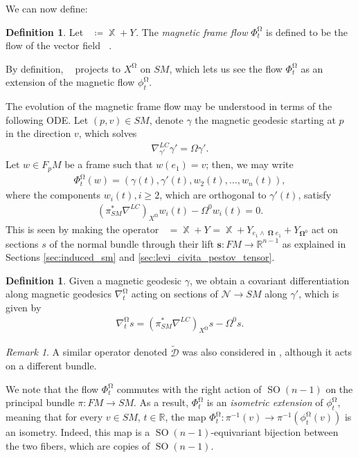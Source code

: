\documentclass[12pt]{amsart}
\numberwithin{numbering}{section}
\theoremstyle{plain}
\theoremstyle{definition}
\newtheorem{df}[numbering]{Definition}
\theoremstyle{remark}
\newtheorem{rmq}[numbering]{Remark}
\numberwithin{equation}{section}
\DeclareMathOperator{\SO}{SO}
\DeclareMathOperator{\xx}{\mathbb{X}}
\DeclareMathOperator{\xs}{\mathbb{X}^{\mg}}
\DeclareMathOperator{\oo}{\mathbf{\Omega}}
\DeclareMathOperator{\ot}{\widetilde{\mathbf{\Omega}}}
\DeclareMathOperator{\mg}{\Omega}
\newcommand{\psm}{\pi_{SM}}
\newcommand{\R}{\mathbb{R}}
\begin{document}
\medskip 

We can now define:
\begin{df}
Let $\xs \coloneq \xx + Y_{\ot}$. The \emph{magnetic frame flow} $\Phi_t^{\mg}$ is defined to be the flow of the vector field $\xs$.
\end{df}
By definition, $\xs$ projects to $X^{\mg}$ on $SM$, which lets us see the flow $\Phi_t^{\mg}$ as an extension of the magnetic flow $\phi_t^{\mg}$.

\medskip

The evolution of the magnetic frame flow may be understood in terms of the following ODE. Let $(p, v) \in SM$, denote $\gamma$ the magnetic geodesic starting at $p$ in the direction $v$, which solves 
\begin{align*}
\nabla^{LC}_{\gamma'} \gamma' = \Omega \gamma'.
\end{align*}
Let $w \in F_pM$ be a frame such that $w(e_1) = v$; then, we may write 
\begin{align*}
\Phi_t^{\mg}(w) = (\gamma(t), \gamma'(t), w_2(t), \ldots, w_n(t)),
\end{align*}
where the components $w_i(t), i \geq 2$, which are orthogonal to $\gamma'(t)$, satisfy 
\begin{align*}
(\psm^*\nabla^{LC})_{X^{\mg}} w_i(t) - \Omega^0 w_i(t) = 0.
\end{align*}
This is seen by making the operator $\xs = \xx + Y_{\ot} = \xx + Y_{e_1 \wedge \oo e_1} + Y_{\oo^0}$ act on sections $s$ of the normal bundle through their lift $\mathbf{s}: FM \to \R^{n-1}$ as explained in Sections \ref{sec:induced_sm} and \ref{sec:levi_civita_pestov_tensor}. 

\begin{df} \label{def:cov_diff}
Given a magnetic geodesic $\gamma$, we obtain a covariant differentiation along magnetic geodesics $\nabla^{\mg}_t$ acting on sections of $\mathcal{N} \to SM$ along $\gamma'$, which is given by 
\begin{align*}
\nabla^{\mg}_t s = (\psm^*\nabla^{LC})_{X^{\mg}} s - \Omega^0 s.
\end{align*}
\end{df}

\begin{rmq}
A similar operator denoted $\tilde{\mathcal{D}}$ was also considered in \cite{assenza2025hopf}, although it acts on a different bundle.
\end{rmq}

\medskip 

We note that the flow $\Phi_t^{\mg}$ commutes with the right action of $\SO(n-1)$ on the principal bundle $\pi: FM \to SM$. As a result, $\Phi_t^{\mg}$ is an \emph{isometric extension} of $\phi_t^{\mg}$, meaning that for every $v \in SM$, $t \in \R$, the map $\Phi_t^{\mg}: \pi^{-1}(v) \to \pi^{-1}(\phi_t^{\mg} (v))$ is an isometry. Indeed, this map is a $\SO(n-1)$-equivariant bijection between the two fibers, which are copies of $\SO(n-1)$.
\end{document}
